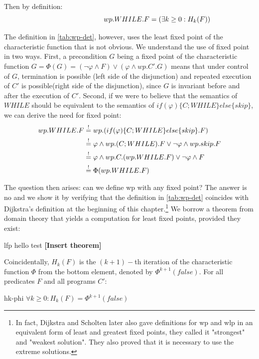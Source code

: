 
Then by definition: 
\begin{equation}
\hspace{2.8cm} wp.WHILE.F=(\exists k\geq 0: H_k(F))  \label{eq:while}
\end{equation}


The definition in \autoref{tab:wp-det}, however, uses the least fixed point of the characteristic function that is not obvious. 
We understand the use of fixed point in two ways. 
First, a precondition $G$ being a fixed point of the characteristic function $G= \Phi(G)=(\neg\varphi\wedge F)\vee(\varphi\wedge wp.C'.G)$ means that under control of $G$, termination is possible (left side of the disjunction) and repeated execution of $C'$ is possible(right side of the disjunction), since $G$ is invariant before and after the execution of $C'$. 
Second, if we were to believe that the semantics of $WHILE$ should be equivalent to the semantics of $if(\varphi)\{C;WHILE\}else\{skip\}$, we can derive the need for fixed point: 
\begin{align*} 
  wp.WHILE.F    & \stackrel{!}{=} wp.(if(\varphi)\{C;WHILE\}else\{skip\}.F) \\
                & \stackrel{!}{=} \varphi\wedge wp.(C;WHILE).F \vee \neg\varphi\wedge wp.skip.F\\ 
                & \stackrel{!}{=} \varphi\wedge wp.C.(wp.WHILE.F) \vee \neg\varphi\wedge F\\ 
                & \stackrel{!}{=} \Phi(wp.WHILE.F)\\ 
\end{align*}

The question then arises: can we define wp with any fixed point? 
The answer is no and we show it by verifying that the definition in \autoref{tab:wp-det} coincides with Dijkstra's definition at the beginning of this chapter.\footnote{In fact, Dijkstra and Scholten\cite{dijkstra90} later also gave definitions for wp and wlp in an equivalent form of least and greatest fixed points, they called it "strongest" and "weakest solution". They also proved that it is necessary to use the extreme solutions. }
We borrow a theorem from domain theory that yields a computation for least fixed points, provided they exist: 
\begin{theorem}{lfp}
hello test 
\textbf{[Insert theorem]}%

\end{theorem}


Coincidentally, $H_k(F)$ is the $(k+1)-$th iteration of the characteristic function $\Phi$ from the bottom element, denoted by $\Phi^{k+1}(false)$. 
For all predicates $F$ and all programs $C'$: 
\begin{lemma}{hk-phi}
$\forall k\geq 0: H_k(F)=\Phi^{k+1}(false)$
\end{lemma}

